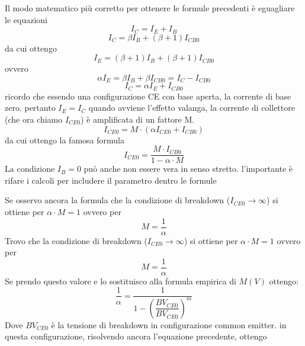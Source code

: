 \begin{citbox}
Il modo matematico più corretto per ottenere le formule precedenti è eguagliare le equazioni
%
\begin{equation*}
    I_C=I_E+I_B
\end{equation*}
%
\begin{equation*}
    I_C=\beta I_B + (\beta+1)I_{CB0}
\end{equation*}
%
da cui ottengo
%
\begin{equation*}
    I_E=(\beta+1)I_B +(\beta+1)I_{CB0}
\end{equation*}
%
ovvero
%
\begin{equation*}
    \alpha I_E=\beta I_B + \beta I_{CB0}=I_C-I_{CB0}
\end{equation*}
%
\begin{equation*}
   I_C=\alpha I_E + I_{CB0} 
\end{equation*}
%
ricordo che essendo una configurazione CE con base aperta, la corrente di base zero. pertanto $I_E=I_C$
quando avviene l'effetto valanga, la corrente di collettore (che ora chiamo $I_{CE0}$) è amplificata di un fattore M. 
%
\begin{equation*}
   I_{CE0}=M\cdot(\alpha I_{CE0} + I_{CB0}) 
\end{equation*}
%
da cui ottengo la famosa formula
%
\begin{equation*}
    I_{CE0}=\dfrac{M\cdot I_{CB0}}{1-\alpha\cdot M}
\end{equation*}
%
La condizione $I_B = 0$ può anche non essere vera in senso stretto. l'importante è rifare i calcoli per includere il parametro dentro le formule
\end{citbox}
%
Se osservo ancora la formula  che la condizione di breakdown ($I_{CE0} \rightarrow\infty$) si ottiene per $\alpha \cdot M=1$ ovvero per 
%
\begin{equation}
    M= \dfrac{1}{\alpha}
\end{equation}
%
Trovo che la condizione di breakdown ($I_{CE0} \rightarrow\infty$) si ottiene per $\alpha \cdot M=1$ ovvero per 
%
\begin{equation}
    M= \dfrac{1}{\alpha}
\end{equation}
%
Se prendo questo valore e lo sostituisco alla formula empirica di $M(V)$ ottengo:
%
\begin{equation}
    \dfrac{1}{\alpha}=\dfrac{1}{1-\left(\dfrac{BV_{CE0}}{BV_{CE0}}\right)^m}
\end{equation}
%
Dove $BV_{CE0}$ è la tensione di breakdown in configurazione common emitter. in questa configurazione, risolvendo ancora l'equazione precedente, ottengo
